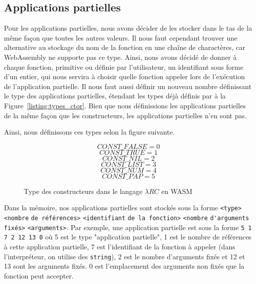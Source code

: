 \documentclass{rapportECL}
\begin{document}
\subsection{Applications partielles}

Pour les applications partielles, nous avons décider de les stocker dans le tas de la même façon que toutes les autres valeurs.
Il nous faut cependant trouver une alternative au stockage du nom de la fonction en une chaîne de charactères, car WebAssembly
ne supporte pas ce type. Ainsi, nous avons décidé de donner à chaque fonction, primitive ou définie par l'utilisateur, un identifiant
sous forme d'un entier, qui nous servira à choisir quelle fonction appeler lors de l'exécution de l'application partielle.
Il nous faut aussi définir un nouveau nombre définissant le type des applications partielles, étendant les types déjà définis
par à la Figure~\ref{listing:types_ctor}. Bien que nous définissions les applications partielles de la même façon que les constructeurs,
les applications partielles n'en sont pas. 

\medskip

Ainsi, nous définissons ces types selon la figure suivante.


\begin{figure}[H]
	\begin{equation*}
	CONST\_FALSE = 0
	\end{equation*}
	\begin{equation*}
	CONST\_TRUE = 1
	\end{equation*}
	\begin{equation*}
	CONST\_NIL = 2
	\end{equation*}
	\begin{equation*}
	CONST\_LIST = 3
	\end{equation*}
	\begin{equation*}
	CONST\_NUM = 4
	\end{equation*}
	\begin{equation*}
	CONST\_PAP = 5
	\end{equation*}
	\caption{Type des constructeurs dans le langage $\lambda{RC}$ en WASM}
	\label{listing:types_ctor_wasm}
	\end{figure}
	\FloatBarrier 

\medskip

Dans la mémoire, nos applications partielles sont stockés sous la forme 
\verb|<type>| \verb|<nombre| \verb|de références>| \verb|<identifiant| \verb|de la fonction>| \verb|<nombre| \verb|d'arguments| \verb|fixés>| \verb|<arguments>|. 
Par exemple, une application partielle est sous la forme \verb|5 1 7 2 12 13 0| où 5 est le type "application partielle", 
1 est le nombre de références à cette application partielle, 
7 est l'identifiant de la fonction à appeler (dans l'interpréteur, on utilise des \verb|string|), 
2 est le nombre d'arguments fixés et 12 et 13 sont les arguments fixés.
0 est l'emplacement des arguments non fixés que la fonction peut accepter.
\end{document}
